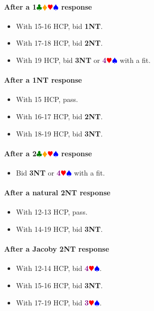 \documentclass{article}
\newcommand{\Hs}{\textcolor{Red}{$\varheart$}}
\newcommand{\Ss}{\textcolor{Blue}{$\spadesuit$}}
\newcommand{\Ds}{\textcolor{Orange}{$\vardiamond$}}
\newcommand{\Cs}{\textcolor{Green}{$\clubsuit$}}
\newcommand{\NTs}{\textbf{\footnotesize{NT}}}
\newcommand{\NT}[1]{\textbf{#1\NTs}}
\newcommand{\suits}[1]{\textbf{#1}\Cs\Ds\Hs\Ss}
\newcommand{\majors}[1]{\textcolor{Purple}{\textbf{#1}}\Hs\Ss}
\begin{document}

\paragraph{After a \suits{1} response}

\begin{itemize}
\item With 15-16 HCP, bid \NT{1}.
\item With 17-18 HCP, bid \NT{2}.
\item With 19 HCP, bid \NT{3} or \majors{4} with a fit.
\end{itemize}

\paragraph{After a \NT{1} response}

\begin{itemize}
\item With 15 HCP, pass.
\item With 16-17 HCP, bid \NT{2}.
\item With 18-19 HCP, bid \NT{3}.
\end{itemize}

\paragraph{After a \suits{2} response}

\begin{itemize}
\item Bid \NT{3} or \majors{4} with a fit.
\end{itemize}

\paragraph{After a natural \NT{2} response}

\begin{itemize}
\item With 12-13 HCP, pass.
\item With 14-19 HCP, bid \NT{3}.
\end{itemize}

\paragraph{After a Jacoby \NT{2} response}

\begin{itemize}
\item With 12-14 HCP, bid \majors{4}.
\item With 15-16 HCP, bid \NT{3}.
\item With 17-19 HCP, bid \majors{3}.
\end{itemize}
\end{document}
